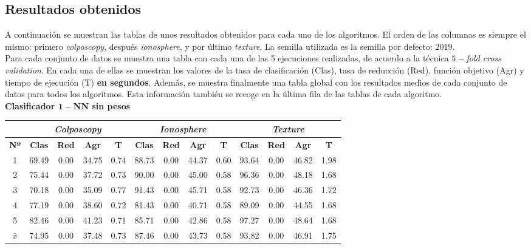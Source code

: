 \documentclass[12pt]{article}
\begin{document}
\subsection*{Resultados obtenidos}
\label{resultados}

A continuación se muestran las tablas de unos resultados obtenidos para cada uno de los algoritmos. El orden de las columnas es siempre el mismo: primero \textit{colposcopy}, después \textit{ionosphere}, y por último \textit{texture}. La semilla utilizada es la semilla por defecto: $2019$.\\

Para cada conjunto de datos se muestra una tabla con cada una de las 5 ejecuciones realizadas, de acuerdo a la técnica $5-$\textit{fold cross validation}. En cada una de ellas se muestran los valores de la tasa de clasificación (Clas), tasa de reducción (Red), función objetivo (Agr) y tiempo de ejecución (T) \textbf{en segundos}. Además, se muestra finalmente una tabla global con los resultados medios de cada conjunto de datos para todos los algoritmos. Esta información también se recoge en la última fila de las tablas de cada algoritmo.\\

\textbf{Clasificador $\boldsymbol{1-}$NN sin pesos}

\begin{table}[h]
\begin{tabular}{ccccc|cccc|cccc}
 & \multicolumn{4}{c}{\textit{Colposcopy}} & \multicolumn{4}{c}{\textit{Ionosphere}} & \multicolumn{4}{c}{\textit{Texture}} \\ \hline
\textbf{Nº} & \textbf{Clas} & \textbf{Red} & \textbf{Agr} & \textbf{T} & \textbf{Clas} & \textbf{Red} & \textbf{Agr} & \textbf{T} & \textbf{Clas} & \textbf{Red} & \textbf{Agr} & \textbf{T} \\ \hline
1 & 69.49 & 0.00 & 34.75 & 0.74 & 88.73 & 0.00 & 44.37 & 0.60 & 93.64 & 0.00 & 46.82 & 1.98\\
2 & 75.44 & 0.00 & 37.72 & 0.73 & 90.00 & 0.00 & 45.00 & 0.58 & 96.36 & 0.00 & 48.18 & 1.68\\
3 & 70.18 & 0.00 & 35.09 & 0.77 & 91.43 & 0.00 & 45.71 & 0.58 & 92.73 & 0.00 & 46.36 & 1.72\\
4 & 77.19 & 0.00 & 38.60 & 0.72 & 81.43 & 0.00 & 40.71 & 0.58 & 89.09 & 0.00 & 44.55 & 1.68\\
5 & 82.46 & 0.00 & 41.23 & 0.71 & 85.71 & 0.00 & 42.86 & 0.58 & 97.27 & 0.00 & 48.64 & 1.68\\
\hline
$\bar{x}$  & 74.95 & 0.00 & 37.48 & 0.73 & 87.46 & 0.00 & 43.73 & 0.58 & 93.82 & 0.00 & 46.91 & 1.75
\end{tabular}
\end{table}
\end{document}
